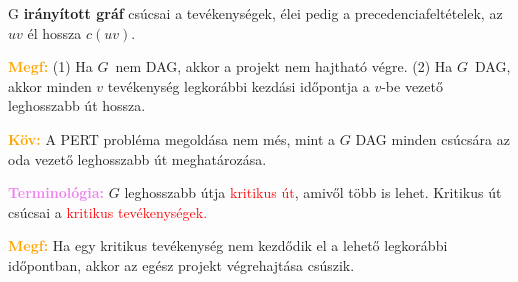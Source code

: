 \documentclass[../../szobeli.tex]{subfiles}
\begin{document}
\begin{itemize}
        G \textbf{irányított gráf} csúcsai a tevékenységek, élei pedig a precedenciafeltételek, az $uv$ él hossza $c(uv)$.

        \textcolor{orange}{\textbf{Megf:}} (1) Ha $G$ nem DAG, akkor a projekt nem hajtható végre. (2) Ha $G$ DAG, akkor minden $v$ tevékenység legkorábbi kezdási időpontja a $v$-be vezető leghosszabb út hossza.

        \textcolor{orange}{\textbf{Köv:}} A PERT probléma megoldása nem més, mint a $G$ DAG minden csúcsára az oda vezető leghosszabb út meghatározása.

        \textcolor{violet}{\textbf{Terminológia:}} $G$ leghosszabb útja \textcolor{red}{kritikus út}, amivől több is lehet. Kritikus út csúcsai a \textcolor{red}{kritikus tevékenységek.}

        \textcolor{orange}{\textbf{Megf:}} Ha egy kritikus tevékenység nem kezdődik el a lehető legkorábbi időpontban, akkor az egész projekt végrehajtása csúszik.


    \end{itemize}
\end{document}
